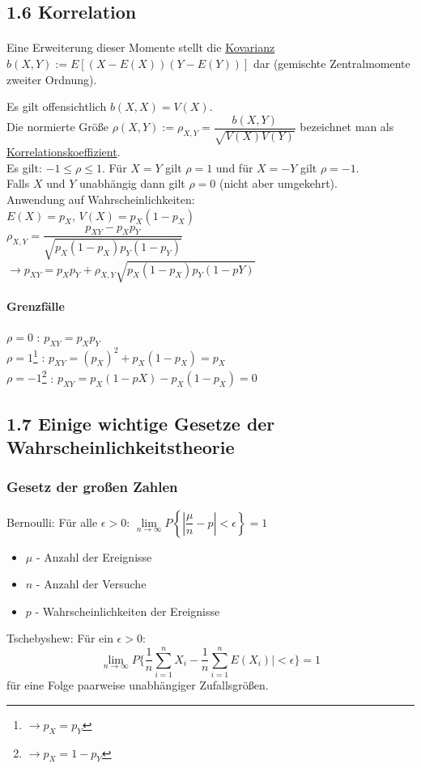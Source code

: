 \documentclass[10pt,a4paper]{article}
\theoremstyle{definition}
\begin{document}
\subsection*{1.6 Korrelation}
\paragraph{} Eine Erweiterung dieser Momente stellt die \underline{Kovarianz}
$b(X,Y) := E\left[\left(X-E(X)\right) \left( Y-E(Y) \right)\right]$
dar (gemischte Zentralmomente zweiter Ordnung).

Es gilt offensichtlich $b(X,X) = V(X)$.\\
Die normierte Größe $\rho(X,Y) := \rho_{X,Y} = \dfrac{b(X,Y)}{\sqrt{V(X)V(Y)}}$ bezeichnet man als \underline{Korrelationskoeffizient}. \\
Es gilt: $-1 \leq \rho \leq 1$. Für $X=Y$ gilt $\rho = 1$ und für $X=-Y$ gilt $\rho = -1$. \\
Falls $X$ und $Y$ unabhängig dann gilt $\rho = 0$ (nicht aber umgekehrt).\\
Anwendung auf Wahrscheinlichkeiten: \\
$E(X) = p_X$, $V(X) = p_X(1 - p_X)$ \\

$\rho_{X,Y} = \dfrac{p_{XY} - p_Xp_Y}{\sqrt{p_X(1-p_X) p_Y(1-p_Y)}}$
$\rightarrow p_{XY} = p_Xp_Y + \rho_{X,Y} \sqrt{p_X(1-p_X)p_Y(1-pY)}$

\paragraph{Grenzfälle}
$\rho = 0$ : $p_{XY} = p_X p_Y$\\
$\rho = 1$\footnote{$\rightarrow p_X = p_Y$} : $p_{XY} = (p_X)^2 + p_X(1-p_X) = p_X$\\
$\rho = -1$\footnote{$\rightarrow p_X = 1 - p_Y$} : $p_{XY} = p_X(1-pX) - p_X(1-p_X) = 0 $\\

\subsection*{1.7 Einige wichtige Gesetze der Wahrscheinlichkeitstheorie}

\subsubsection*{Gesetz der großen Zahlen}
Bernoulli: Für alle $\epsilon > 0$: $\lim\limits_{n \rightarrow \infty}{P \left\lbrace| \dfrac{\mu}{n} - p | < \epsilon \right\rbrace} = 1$
\begin{itemize}
	\item $\mu$ - Anzahl der Ereignisse
	\item $n$ - Anzahl der Versuche
	\item $p$ - Wahrscheinlichkeiten der Ereignisse
\end{itemize}
Tschebyshew: Für ein $\epsilon >0$:
\[\lim\limits_{n \to \infty} P\{\frac{1}{n} \sum_{i=1}^{n} X_i - \frac{1}{n} \sum_{i=1}^{n} E(X_i)| < \epsilon \} = 1\] für eine Folge paarweise unabhängiger Zufallsgrößen.\\
\end{document}
